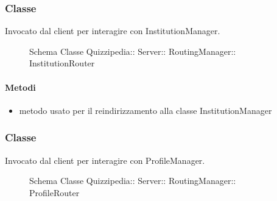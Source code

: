 \subsubsection{Classe }
Invocato dal client per interagire con InstitutionManager.
\begin{figure}[H]
\centering
\noindent{}
\caption[Schema Classe InstitutionRouter]{Schema Classe Quizzipedia:: Server:: RoutingManager:: InstitutionRouter}
\end{figure}
\paragraph{Metodi}
\begin{itemize}
\item {}
\newline
metodo usato per il reindirizzamento alla classe InstitutionManager
\newline
\end{itemize}
\subsubsection{Classe }
Invocato dal client per interagire con ProfileManager.
\begin{figure}[H]
\centering
\noindent{}
\caption[Schema Classe ProfileRouter]{Schema Classe Quizzipedia:: Server:: RoutingManager:: ProfileRouter}
\end{figure}
